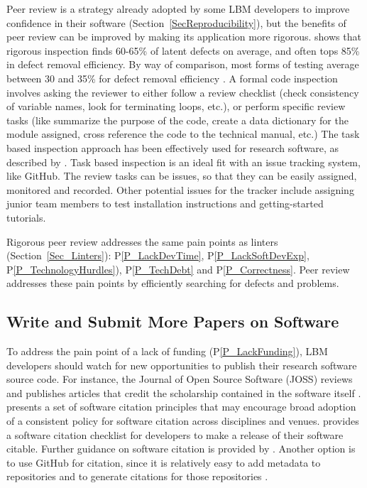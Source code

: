 \documentclass[final, 3p, times, authoryear]{elsarticle}
\newcommand{\ppref}[1]{P\ref{#1}}
\begin{document}
Peer review is a strategy already adopted by some LBM developers to improve
confidence in their software (Section~\ref{SecReproducibility}), but the
benefits of peer review can be improved by making its application more rigorous.
\citet{Jones2008} shows that rigorous inspection finds 60-65\% of latent defects
on average, and often tops 85\% in defect removal efficiency.  By way of
comparison, most forms of testing average between 30 and 35\% for defect removal
efficiency \citep{EbertAndJones2009, Jones2008}.  A formal code inspection
involves asking the reviewer to either follow a review checklist (check
consistency of variable names, look for terminating loops, etc.), or perform
specific review tasks (like summarize the purpose of the code, create a data
dictionary for the module assigned, cross reference the code to the technical
manual, etc.) The task based inspection approach has been effectively used for
research software, as described by \citet{KellyAndShepard2000}. Task based
inspection is an ideal fit with an issue tracking system, like GitHub.  The
review tasks can be issues, so that they can be easily assigned, monitored and
recorded.  Other potential issues for the tracker include assigning junior team
members to test installation instructions and getting-started tutorials.

Rigorous peer review addresses the same pain points as linters
(Section~\ref{Sec_Linters}): \ppref{P_LackDevTime}, \ppref{P_LackSoftDevExp},
\ppref{P_TechnologyHurdles}), \ppref{P_TechDebt} and \ppref{P_Correctness}. Peer
review addresses these pain points by efficiently searching for defects and
problems.

\subsection{Write and Submit More Papers on Software} \label{Sec_MorePapers}

To address the pain point of a lack of funding (\ppref{P_LackFunding}), LBM
developers should watch for new opportunities to publish their research software
source code. For instance, the Journal of Open Source Software (JOSS) reviews
and publishes articles that credit the scholarship contained in the software
itself \citep{SmithEtAl2018-joss}.  \citep{SmithEtAl2016-softcite} presents a
set of software citation principles that may encourage broad adoption of a
consistent policy for software citation across disciplines and venues.
\citep{ChueHongEtAl2019} provides a software citation checklist for developers
to make a release of their software citable.  Further guidance on software
citation is provided by \citet{KatzEtAl2021}.  Another option is to use GitHub
for citation, since it is relatively easy to add metadata to repositories and to
generate citations for those repositories \citet{Smith2021-CitationsOnGitHub}.
\end{document}
